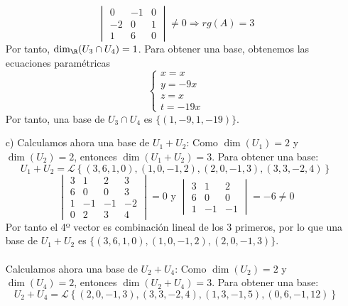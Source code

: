 \begin{ejercicio}
\begin{enumerate}
\begin{equation*}
\begin{vmatrix}
					0  & -1 & 0 \\
					-2 & 0  & 1 \\
					1  & 6  & 0
				\end{vmatrix} \neq 0 \Rightarrow rg(A) = 3
			\end{equation*}
			Por tanto, $\dim_\R(U_3 \cap U_4) = 1$. Para obtener una base, obtenemos las ecuaciones paramétricas
			\begin{equation*}
				\begin{cases}
					x = x   \\
					y = -9x \\
					z = x   \\
					t = -19x
				\end{cases}
			\end{equation*}
			Por tanto, una base de $U_3 \cap U_4$ es $\{(1, -9, 1, -19)\}$.
		\item[c)] Calculamos ahora una base de $U_1 + U_2$:
			Como $\dim(U_1) = 2$ y $\dim(U_2) = 2$, entonces $\dim(U_1 + U_2) = 3$. Para obtener una base:
			\begin{equation*}
				U_1 + U_2 = \mathcal{L}\left\{(3,6,1,0), (1,0,-1,2), (2,0,-1,3), (3,3,-2,4)\right\}
			\end{equation*}
			\begin{equation*}
				\begin{vmatrix}
					3 & 1  & 2  & 3  \\
					6 & 0  & 0  & 3  \\
					1 & -1 & -1 & -2 \\
					0 & 2  & 3  & 4
				\end{vmatrix} = 0 \text { y } \begin{vmatrix}
					3 & 1  & 2  \\
					6 & 0  & 0  \\
					1 & -1 & -1
				\end{vmatrix} = -6 \neq 0
			\end{equation*}
			Por tanto el 4º vector es combinación lineal de los 3 primeros, por lo que una base de $U_1 + U_2$ es $\{(3,6,1,0), (1,0,-1,2), (2,0,-1,3)\}$.
			\\ \\
			Calculamos ahora una base de $U_2 + U_4$:
			Como $\dim(U_2) = 2$ y $\dim(U_4) = 2$, entonces $\dim(U_2 + U_4) = 3$. Para obtener una base:
			\begin{equation*}
				U_2 + U_4 = \mathcal{L}\left\{(2,0,-1,3), (3,3,-2,4), (1,3,-1,5), (0,6,-1,12)\right\}
			\end{equation*}
			\begin{equation*}

\end{equation*}
\end{enumerate}
\end{ejercicio}
